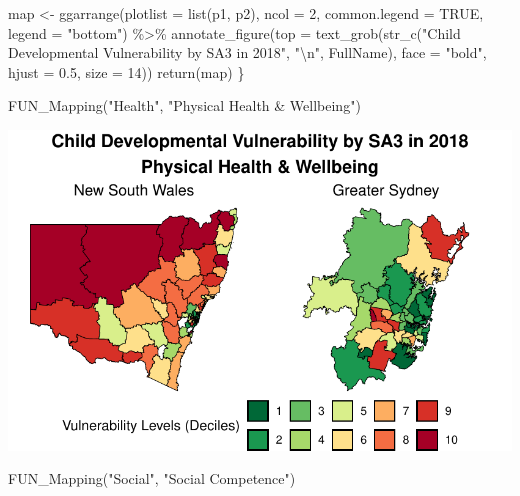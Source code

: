 \documentclass[
  letterpaper,
  DIV=11,
  numbers=noendperiod]{scrartcl}
\newenvironment{Shaded}{\begin{snugshade}}{\end{snugshade}}
\newcommand{\AttributeTok}[1]{\textcolor[rgb]{0.40,0.45,0.13}{#1}}
\newcommand{\ConstantTok}[1]{\textcolor[rgb]{0.56,0.35,0.01}{#1}}
\newcommand{\DecValTok}[1]{\textcolor[rgb]{0.68,0.00,0.00}{#1}}
\newcommand{\FloatTok}[1]{\textcolor[rgb]{0.68,0.00,0.00}{#1}}
\newcommand{\FunctionTok}[1]{\textcolor[rgb]{0.28,0.35,0.67}{#1}}
\newcommand{\NormalTok}[1]{\textcolor[rgb]{0.00,0.23,0.31}{#1}}
\newcommand{\OtherTok}[1]{\textcolor[rgb]{0.00,0.23,0.31}{#1}}
\newcommand{\SpecialCharTok}[1]{\textcolor[rgb]{0.37,0.37,0.37}{#1}}
\newcommand{\StringTok}[1]{\textcolor[rgb]{0.13,0.47,0.30}{#1}}
\begin{document}
\begin{Shaded}
\begin{Highlighting}[]
\NormalTok{  map }\OtherTok{\textless{}{-}} \FunctionTok{ggarrange}\NormalTok{(}\AttributeTok{plotlist =} \FunctionTok{list}\NormalTok{(p1, p2),}
                   \AttributeTok{ncol =} \DecValTok{2}\NormalTok{,}
                   \AttributeTok{common.legend =} \ConstantTok{TRUE}\NormalTok{, }\AttributeTok{legend =} \StringTok{"bottom"}\NormalTok{) }\SpecialCharTok{\%\textgreater{}\%}
    \FunctionTok{annotate\_figure}\NormalTok{(}\AttributeTok{top =} \FunctionTok{text\_grob}\NormalTok{(}\FunctionTok{str\_c}\NormalTok{(}\StringTok{"Child Developmental Vulnerability by SA3 in 2018"}\NormalTok{,}
                                          \StringTok{"}\SpecialCharTok{\textbackslash{}n}\StringTok{"}\NormalTok{, FullName), }
                                    \AttributeTok{face =} \StringTok{"bold"}\NormalTok{,}
                                    \AttributeTok{hjust =} \FloatTok{0.5}\NormalTok{,}
                                    \AttributeTok{size =} \DecValTok{14}\NormalTok{))}
  \FunctionTok{return}\NormalTok{(map)}
\NormalTok{\}}

\FunctionTok{FUN\_Mapping}\NormalTok{(}\StringTok{"Health"}\NormalTok{, }\StringTok{"Physical Health \& Wellbeing"}\NormalTok{)}
\end{Highlighting}
\end{Shaded}

\includegraphics{variable_def_and_maps_files/figure-pdf/maps-AEDC-1.pdf}

\begin{Shaded}
\begin{Highlighting}[]
\FunctionTok{FUN\_Mapping}\NormalTok{(}\StringTok{"Social"}\NormalTok{, }\StringTok{"Social Competence"}\NormalTok{)}
\end{Highlighting}
\end{Shaded}
\end{document}
